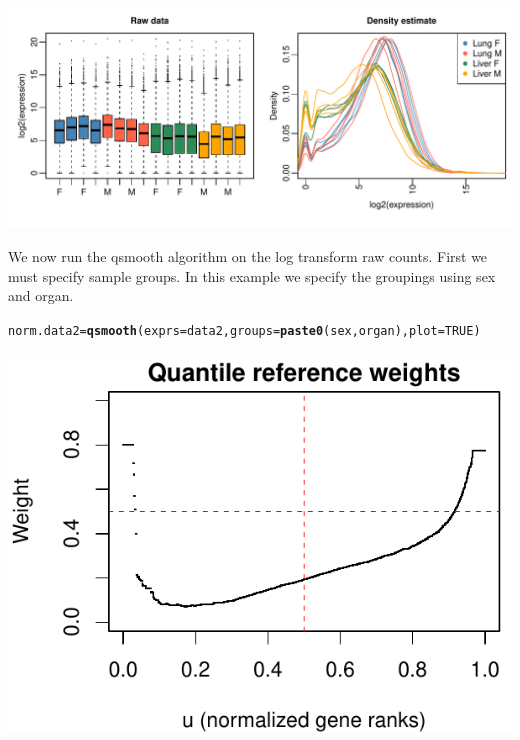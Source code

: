 \documentclass{article}\usepackage[]{graphicx}\usepackage[usenames,dvipsnames]{color}
\makeatletter
\def\maxwidth{ %
  \ifdim\Gin@nat@width>\linewidth
    \linewidth
  \else
    \Gin@nat@width
  \fi
}
\newcommand{\hlnum}[1]{\textcolor[rgb]{0.686,0.059,0.569}{#1}}%
\newcommand{\hlstd}[1]{\textcolor[rgb]{0.345,0.345,0.345}{#1}}%
\newcommand{\hlkwb}[1]{\textcolor[rgb]{0.69,0.353,0.396}{#1}}%
\newcommand{\hlkwc}[1]{\textcolor[rgb]{0.333,0.667,0.333}{#1}}%
\newcommand{\hlkwd}[1]{\textcolor[rgb]{0.737,0.353,0.396}{\textbf{#1}}}%
\newenvironment{kframe}{%
 \def\at@end@of@kframe{}%
 \ifinner\ifhmode%
  \def\at@end@of@kframe{\end{minipage}}%
  \begin{minipage}{\columnwidth}%
 \fi\fi%
 \def\FrameCommand##1{\hskip\@totalleftmargin \hskip-\fboxsep
 \colorbox{shadecolor}{##1}\hskip-\fboxsep
     \hskip-\linewidth \hskip-\@totalleftmargin \hskip\columnwidth}%
 \MakeFramed {\advance\hsize-\width
   \@totalleftmargin\z@ \linewidth\hsize
   \@setminipage}}%
 {\par\unskip\endMakeFramed%
 \at@end@of@kframe}
\newenvironment{knitrout}{}{} %
\makeatother
\begin{document}
\begin{knitrout}
\color{fgcolor}

{\centering \includegraphics[width=\maxwidth]{figure/norm_data2-1} 

}



\end{knitrout}

We now run the qsmooth algorithm on the log transform raw counts.
First we must specify sample groups. In this example we specify
the groupings using sex and organ. 

\begin{knitrout}
\color{fgcolor}\begin{kframe}
\begin{alltt}
\hlstd{norm.data2} \hlkwb{=} \hlkwd{qsmooth}\hlstd{(}\hlkwc{exprs}\hlstd{=data2,} \hlkwc{groups}\hlstd{=}\hlkwd{paste0}\hlstd{(sex, organ),} \hlkwc{plot}\hlstd{=}\hlnum{TRUE}\hlstd{)}
\end{alltt}
\end{kframe}

{\centering \includegraphics[width=\maxwidth]{figure/qsmooth12-1} 

}



\end{knitrout}
\end{document}
